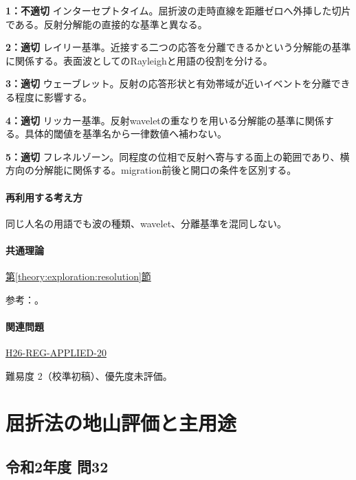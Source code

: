 \noindent\textbf{1：不適切} インターセプトタイム。屈折波の走時直線を距離ゼロへ外挿した切片である。反射分解能の直接的な基準と異なる。\par

\noindent\textbf{2：適切} レイリー基準。近接する二つの応答を分離できるかという分解能の基準に関係する。表面波としてのRayleighと用語の役割を分ける。\par

\noindent\textbf{3：適切} ウェーブレット。反射の応答形状と有効帯域が近いイベントを分離できる程度に影響する。\par

\noindent\textbf{4：適切} リッカー基準。反射waveletの重なりを用いる分解能の基準に関係する。具体的閾値を基準名から一律数値へ補わない。\par

\noindent\textbf{5：適切} フレネルゾーン。同程度の位相で反射へ寄与する面上の範囲であり、横方向の分解能に関係する。migration前後と開口の条件を区別する。\par

\paragraph{再利用する考え方} 同じ人名の用語でも波の種類、wavelet、分離基準を混同しない。

\paragraph{共通理論} \hyperref[theory:exploration:resolution]{第\ref*{theory:exploration:resolution}節}

\par 参考：\cite{seg_vertical_resolution,seg_lateral_resolution,usgs_refraction2013}。

\paragraph{関連問題} \hyperref[q:h26-reg-applied-20]{H26-REG-APPLIED-20}

\par 難易度 2（校準初稿）、優先度未評価。

\section{屈折法の地山評価と主用途}

\subsection{令和2年度 問32}
\label{q:r02-reg-applied-32}

